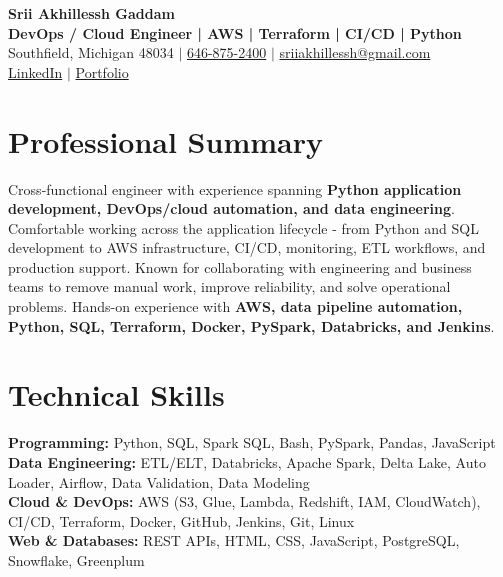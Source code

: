 \documentclass[letterpaper,10pt]{article}
\begin{document}
\fontsize{9.35pt}{10.45pt}\selectfont

\begin{center}
    {\LARGE \textbf{Srii Akhillessh Gaddam}} \\[-1pt]
    \textbf{DevOps / Cloud Engineer | AWS | Terraform | CI/CD | Python} \\[2pt]
    Southfield, Michigan 48034 $|$
    \href{tel:6468752400}{646-875-2400} $|$
    \href{mailto:sriiakhillessh@gmail.com}{sriiakhillessh@gmail.com} \\[1pt]
    \href{https://www.linkedin.com/in/srii-akhiilessh-gaddam-b48668191/}{LinkedIn} $|$
    \href{https://sriiakhillesshg.github.io/portfolio/}{Portfolio}
\end{center}
\vspace{-8pt}

\section{Professional Summary}
\small{Cross-functional engineer with experience spanning \textbf{Python application development, DevOps/cloud automation, and data engineering}. Comfortable working across the application lifecycle - from Python and SQL development to AWS infrastructure, CI/CD, monitoring, ETL workflows, and production support. Known for collaborating with engineering and business teams to remove manual work, improve reliability, and solve operational problems. Hands-on experience with \textbf{AWS, data pipeline automation, Python, SQL, Terraform, Docker, PySpark, Databricks, and Jenkins}.}

\section{Technical Skills}
\small{
\textbf{Programming:} Python, SQL, Spark SQL, Bash, PySpark, Pandas, JavaScript \\
\textbf{Data Engineering:} ETL/ELT, Databricks, Apache Spark, Delta Lake, Auto Loader, Airflow, Data Validation, Data Modeling \\
\textbf{Cloud \& DevOps:} AWS (S3, Glue, Lambda, Redshift, IAM, CloudWatch), CI/CD, Terraform, Docker, GitHub, Jenkins, Git, Linux \\
\textbf{Web \& Databases:} REST APIs, HTML, CSS, JavaScript, PostgreSQL, Snowflake, Greenplum
}
\end{document}
